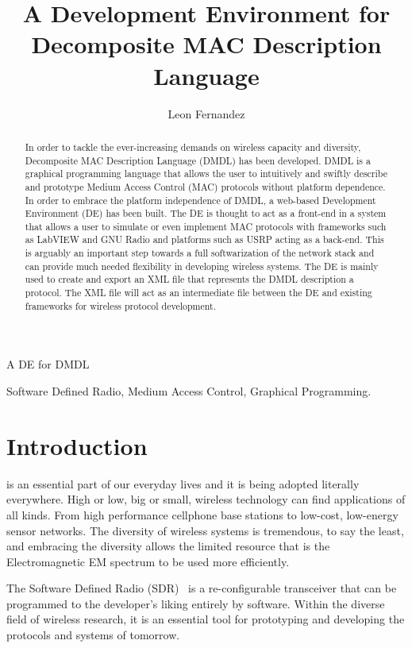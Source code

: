 \documentclass[journal,comsoc]{IEEEtran}
\begin{document}
\title{A Development Environment for Decomposite MAC Description Language}
\author{Leon Fernandez}
%
{A DE for DMDL}
\maketitle

\begin{abstract}
In order to tackle the ever-increasing demands on wireless capacity and diversity,
Decomposite MAC Description Language (DMDL) has been developed. DMDL is a graphical
programming language that allows the user to intuitively and swiftly describe and
prototype Medium Access Control (MAC) protocols without platform dependence.
In order to embrace the platform independence of DMDL, a web-based Development Environment (DE)
has been built. The DE is thought to act as a front-end in a system that allows a user to
simulate or even implement MAC protocols with frameworks such as LabVIEW and GNU Radio and
platforms such as USRP acting as a back-end. This is arguably an important step towards a
full softwarization of the network stack and can provide much needed flexibility in developing
wireless systems. The DE is mainly used to create and export an XML file that represents the DMDL
description a protocol. The XML file will act as an intermediate file between the DE and existing
frameworks for wireless protocol development.

\end{abstract}

\begin{IEEEkeywords}
Software Defined Radio, Medium Access Control, Graphical Programming.
\end{IEEEkeywords}

\section{Introduction}
 is an essential part of our everyday lives and it is
being adopted literally everywhere. High or low, big or small, wireless technology can
find applications of all kinds. From high performance cellphone base stations to low-cost,
low-energy sensor networks. The diversity of wireless systems is tremendous, to say the least,
and embracing the diversity allows the limited resource that is the Electromagnetic EM spectrum to
be used more efficiently.

The Software Defined Radio (SDR)~\cite{sdr} is a re-configurable transceiver that can be programmed
to the developer's liking entirely by software. Within the diverse field of wireless research,
it is an essential tool for prototyping and developing the protocols and systems of tomorrow.
\end{document}
